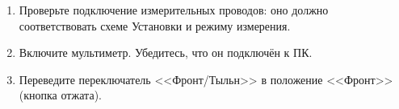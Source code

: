 \begin{enumerate}

\item Проверьте подключение измерительных проводов: оно должно соответствовать схеме Установки и режиму измерения.
\item Включите мультиметр. Убедитесь, что он подключён к ПК.
\item Переведите переключатель <<Фронт/Тыльн>> в положение <<Фронт>> (кнопка отжата). 

\end{enumerate}
